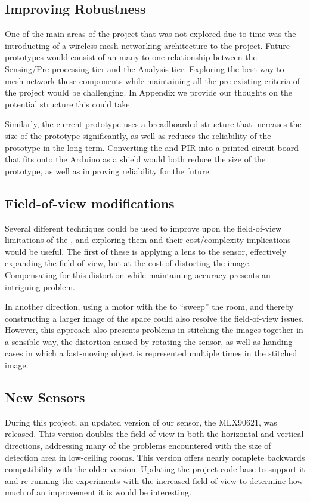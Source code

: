 \documentclass[../thesis/thesis.tex]{subfiles}
\begin{document}
\subsection{Improving Robustness}
One of the main areas of the project that was not explored due to time was the introducting of a wireless mesh networking architecture to the project. Future prototypes would consist of an many-to-one relationship between the Sensing/Pre-processing tier and the Analysis tier. Exploring the best way to mesh network these components while maintaining all the pre-existing criteria of the project would be challenging. In Appendix  we provide our thoughts on the potential structure this could take.

Similarly, the current prototype uses a breadboarded structure that increases the size of the prototype significantly, as well as reduces the reliability of the prototype in the long-term. Converting the \mlx and PIR into a printed circuit board that fits onto the Arduino as a shield would both reduce the size of the prototype, as well as improving reliability for the future.

\subsection{Field-of-view modifications}
Several different techniques could be used to improve upon the field-of-view limitations of the \mlx, and exploring them and their cost/complexity implications would be useful. The first of these is applying a lens to the sensor, effectively expanding the field-of-view, but at the cost of distorting the image. Compensating for this distortion while maintaining accuracy presents an intriguing problem.

In another direction, using a motor with the \mlx to ``sweep'' the room, and thereby constructing a larger image of the space could also resolve the field-of-view issues. However, this approach also presents problems in stitching the images together in a sensible way, the distortion caused by rotating the sensor, as well as handing cases in which a fast-moving object is represented multiple times in the stitched image.

\subsection{New Sensors}
During this project, an updated version of our sensor, the MLX90621, was released. This version doubles the field-of-view in both the horizontal and vertical directions, addressing many of the problems encountered with the size of detection area in low-ceiling rooms. This version offers nearly complete backwards compatibility with the older version. Updating the project code-base to support it and re-running the experiments with the increased field-of-view to determine how much of an improvement it is would be interesting.
\end{document}
